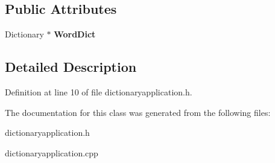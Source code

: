 \subsection*{Public Attributes}
\begin{DoxyCompactItemize}
\item 
\mbox{\label{classDictionaryApplication_aac64e0b0a0c563926f55c7a6e3a3c304}} 
Dictionary $\ast$ {\bfseries Word\+Dict}
\end{DoxyCompactItemize}


\subsection{Detailed Description}


Definition at line 10 of file dictionaryapplication.\+h.



The documentation for this class was generated from the following files\+:\begin{DoxyCompactItemize}
\item 
dictionaryapplication.\+h\item 
dictionaryapplication.\+cpp\end{DoxyCompactItemize}
